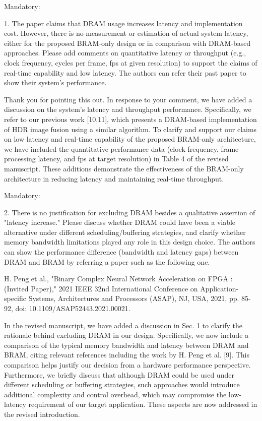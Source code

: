 \documentclass[a4j]{jsarticle}
\begin{document}
\begin{screen}
Mandatory:

1. The paper claims that DRAM usage increases latency and implementation cost. However, there is no measurement or estimation of actual system latency, either for the proposed BRAM-only design or in comparison with DRAM-based approaches. Please add comments on quantitative latency or throughput (e.g., clock frequency, cycles per frame, fps at given resolution) to support the claims of real-time capability and low latency. The authors can refer their past paper to show their system's performance.
\end{screen}

Thank you for pointing this out. In response to your comment, we have added a discussion on the system's latency and throughput performance.
Specifically, we refer to our previous work [10,11], which presents a DRAM-based implementation of HDR image fusion using a similar algorithm.
To clarify and support our claims on low latency and real-time capability of the proposed BRAM-only architecture, 
we have included the quantitative performance data (clock frequency, frame processing latency, and fps at target resolution) in Table 4 of the revised manuscript. 
These additions demonstrate the effectiveness of the BRAM-only architecture in reducing latency and maintaining real-time throughput.


\vspace{0.3cm}
\begin{screen}
Mandatory:

2. There is no justification for excluding DRAM besides a qualitative assertion of "latency increase." Please discuss whether DRAM could have been a viable alternative under different scheduling/buffering strategies, and clarify whether memory bandwidth limitations played any role in this design choice. The authors can show the performance difference (bandwidth and latency gaps) between DRAM and BRAM by referring a paper such as the following one.

H. Peng et al., "Binary Complex Neural Network Acceleration on FPGA : (Invited Paper)," 2021 IEEE 32nd International Conference on Application-specific Systems, Architectures and Processors (ASAP), NJ, USA, 2021, pp. 85-92, doi: 10.1109/ASAP52443.2021.00021.
\end{screen}
In the revised manuscript, we have added a discussion in Sec. 1 to clarify the rationale behind excluding DRAM in our design.
Specifically, we now include a comparison of the typical memory bandwidth and latency between DRAM and BRAM, 
citing relevant references including the work by H. Peng et al. [9]. 
This comparison helps justify our decision from a hardware performance perspective.
Furthermore, we briefly discuss that although DRAM could be used under different scheduling or buffering strategies, 
such approaches would introduce additional complexity and control overhead, which may compromise the low-latency requirement of our target application. 
These aspects are now addressed in the revised introduction.
\end{document}
